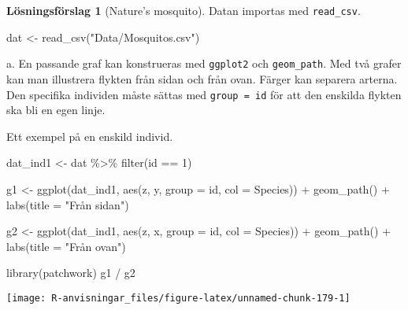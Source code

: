 \documentclass[
]{book}
\newenvironment{Shaded}{\begin{snugshade}}{\end{snugshade}}
\newcommand{\AttributeTok}[1]{\textcolor[rgb]{0.77,0.63,0.00}{#1}}
\newcommand{\DecValTok}[1]{\textcolor[rgb]{0.00,0.00,0.81}{#1}}
\newcommand{\FunctionTok}[1]{\textcolor[rgb]{0.00,0.00,0.00}{#1}}
\newcommand{\NormalTok}[1]{#1}
\newcommand{\OtherTok}[1]{\textcolor[rgb]{0.56,0.35,0.01}{#1}}
\newcommand{\SpecialCharTok}[1]{\textcolor[rgb]{0.00,0.00,0.00}{#1}}
\newcommand{\StringTok}[1]{\textcolor[rgb]{0.31,0.60,0.02}{#1}}
\theoremstyle{definition}
\theoremstyle{definition}
\theoremstyle{definition}
\theoremstyle{definition}
\newtheorem{hypothesis}{Lösningsförslag}[chapter]
\theoremstyle{remark}
\begin{document}
\begin{hypothesis}[Nature's mosquito]
Datan importas med \texttt{read\_csv}.

\begin{Shaded}
\begin{Highlighting}[]
\NormalTok{dat }\OtherTok{\textless{}{-}} \FunctionTok{read\_csv}\NormalTok{(}\StringTok{"Data/Mosquitos.csv"}\NormalTok{)}
\end{Highlighting}
\end{Shaded}

a. En passande graf kan konstrueras med \texttt{ggplot2} och \texttt{geom\_path}. Med två grafer kan man illustrera flykten från sidan och från ovan. Färger kan separera arterna. Den specifika individen måste sättas med \texttt{group\ =\ id} för att den enskilda flykten ska bli en egen linje.

Ett exempel på en enskild individ.

\begin{Shaded}
\begin{Highlighting}[]
\NormalTok{dat\_ind1 }\OtherTok{\textless{}{-}}\NormalTok{ dat }\SpecialCharTok{\%\textgreater{}\%} \FunctionTok{filter}\NormalTok{(id }\SpecialCharTok{==} \DecValTok{1}\NormalTok{)}

\NormalTok{g1 }\OtherTok{\textless{}{-}} \FunctionTok{ggplot}\NormalTok{(dat\_ind1, }\FunctionTok{aes}\NormalTok{(z, y, }\AttributeTok{group =}\NormalTok{ id, }\AttributeTok{col =}\NormalTok{ Species)) }\SpecialCharTok{+} 
  \FunctionTok{geom\_path}\NormalTok{() }\SpecialCharTok{+}
  \FunctionTok{labs}\NormalTok{(}\AttributeTok{title =} \StringTok{"Från sidan"}\NormalTok{)}

\NormalTok{g2 }\OtherTok{\textless{}{-}} \FunctionTok{ggplot}\NormalTok{(dat\_ind1, }\FunctionTok{aes}\NormalTok{(z, x, }\AttributeTok{group =}\NormalTok{ id, }\AttributeTok{col =}\NormalTok{ Species)) }\SpecialCharTok{+} 
  \FunctionTok{geom\_path}\NormalTok{() }\SpecialCharTok{+}
  \FunctionTok{labs}\NormalTok{(}\AttributeTok{title =} \StringTok{"Från ovan"}\NormalTok{)}

\FunctionTok{library}\NormalTok{(patchwork)}
\NormalTok{g1 }\SpecialCharTok{/}\NormalTok{ g2}
\end{Highlighting}
\end{Shaded}

\begin{center}\texttt{[image: R-anvisningar\_files/figure-latex/unnamed-chunk-179-1]} \end{center}


\end{hypothesis}
\end{document}
